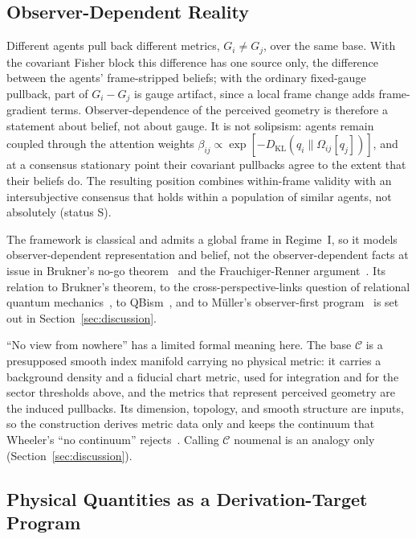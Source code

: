 \subsection{Observer-Dependent Reality}
\label{sec:observer}

Different agents pull back different metrics, $G_i \neq G_j$, over the same base. With the covariant Fisher block this difference has one source only, the difference between the agents' frame-stripped beliefs; with the ordinary fixed-gauge pullback, part of $G_i - G_j$ is gauge artifact, since a local frame change adds frame-gradient terms. Observer-dependence of the perceived geometry is therefore a statement about belief, not about gauge. It is not solipsism: agents remain coupled through the attention weights $\beta_{ij} \propto \exp[-D_{\mathrm{KL}}(q_i \| \Omega_{ij}[q_j])]$, and at a consensus stationary point their covariant pullbacks agree to the extent that their beliefs do. The resulting position combines within-frame validity with an intersubjective consensus that holds within a population of similar agents, not absolutely (status S).

The framework is classical and admits a global frame in Regime~I, so it models observer-dependent representation and belief, not the observer-dependent facts at issue in Brukner's no-go theorem~\cite{Brukner2018} and the Frauchiger-Renner argument~\cite{frauchiger2018quantum}. Its relation to Brukner's theorem, to the cross-perspective-links question of relational quantum mechanics~\cite{AdlamRovelli2022}, to QBism~\cite{Fuchs2017, DeBrotaFuchsSchack2020}, and to M\"uller's observer-first program~\cite{Mueller2020} is set out in Section~\ref{sec:discussion}.

``No view from nowhere'' has a limited formal meaning here. The base $\mathcal{C}$ is a presupposed smooth index manifold carrying no physical metric: it carries a background density and a fiducial chart metric, used for integration and for the sector thresholds above, and the metrics that represent perceived geometry are the induced pullbacks. Its dimension, topology, and smooth structure are inputs, so the construction derives metric data only and keeps the continuum that Wheeler's ``no continuum'' rejects~\cite{Wheeler1990}. Calling $\mathcal{C}$ noumenal is an analogy only (Section~\ref{sec:discussion}).

\subsection{Physical Quantities as a Derivation-Target Program}
\label{sec:phenomenological_interpretation}

